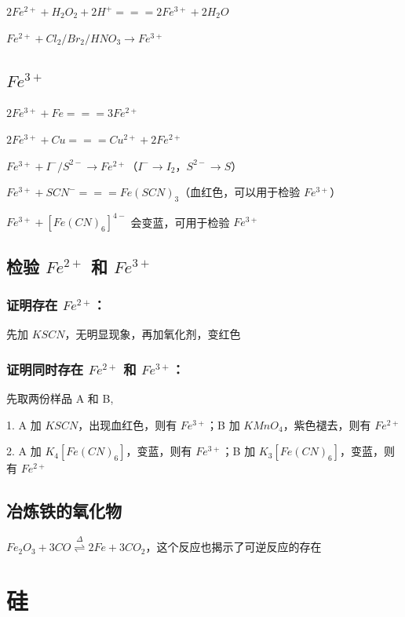 \documentclass[UTF8,zihao=-4,openany]{ctexbook}
\begin{document}
$2Fe^{2+}+H_2O_2+2H^+=\!=\!=2Fe^{3+}+2H_2O$\par

$Fe^{2+}+Cl_2/Br_2/HNO_3\rightarrow Fe^{3+}$\par
\subsection{$Fe^{3+}$}
$2Fe^{3+}+Fe=\!=\!=3Fe^{2+}$\par

$2Fe^{3+}+Cu=\!=\!=Cu^{2+}+2Fe^{2+}$\par

$Fe^{3+}+I^-/S^{2-}\rightarrow Fe^{2+}$（$I^-\rightarrow I_2$，$S^{2-}\rightarrow S$）\par

$Fe^{3+}+SCN^-=\!=\!=Fe(SCN)_3$（血红色，可以用于检验 $Fe^{3+}$）\par

$Fe^{3+}+[Fe(CN)_6]^{4-}$ 会变蓝，可用于检验 $Fe^{3+}$\par
\subsection{检验 $Fe^{2+}$ 和 $Fe^{3+}$}
\subsubsection{证明存在 $Fe^{2+}$：}
先加 $KSCN$，无明显现象，再加氧化剂，变红色\par
\subsubsection{证明同时存在 $Fe^{2+}$ 和 $Fe^{3+}$：}
先取两份样品 A 和 B,\par

1. A 加 $KSCN$，出现血红色，则有 $Fe^{3+}$；B 加 $KMnO_4$，紫色褪去，则有 $Fe^{2+}$\par

2. A 加 $K_4[Fe(CN)_6]$，变蓝，则有 $Fe^{3+}$；B 加 $K_3[Fe(CN)_6]$，变蓝，则有 $Fe^{2+}$\par

\subsection{冶炼铁的氧化物}
$Fe_2O_3+3CO\stackrel{\Delta}{\rightleftharpoons}2Fe+3CO_2$，这个反应也揭示了可逆反应的存在\par
\section{硅}
\end{document}
